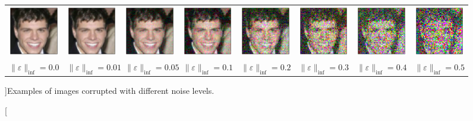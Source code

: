 \begin{figure}[h]
{\begin{tabular}{c|ccccccc}
        \includegraphics[width=0.11\linewidth]{pics/3_adv_att/radius_celeba_ref.pdf} &
        \includegraphics[width=0.11\linewidth]{pics/3_adv_att/radius_celeba_adv_0.pdf} &
        \includegraphics[width=0.11\linewidth]{pics/3_adv_att/radius_celeba_adv_1.pdf} &
        \includegraphics[width=0.11\linewidth]{pics/3_adv_att/radius_celeba_adv_2.pdf} &
        \includegraphics[width=0.11\linewidth]{pics/3_adv_att/radius_celeba_adv_3.pdf} &
        \includegraphics[width=0.11\linewidth]{pics/3_adv_att/radius_celeba_adv_4.pdf} &
        \includegraphics[width=0.11\linewidth]{pics/3_adv_att/radius_celeba_adv_5.pdf} &
        \includegraphics[width=0.11\linewidth]{pics/3_adv_att/radius_celeba_adv_6.pdf} \\
        $\|\varepsilon\|_{\inf} = 0.0$ & $\|\varepsilon\|_{\inf} = 0.01$ & $\|\varepsilon\|_{\inf} = 0.05$  &  $\|\varepsilon\|_{\inf} = 0.1$ &  $\|\varepsilon\|_{\inf} = 0.2$& $\|\varepsilon\|_{\inf} = 0.3$ & $\|\varepsilon\|_{\inf} = 0.4$ &  $\|\varepsilon\|_{\inf} = 0.5$\\
    \end{tabular}}
    \caption[][\baselineskip]{Examples of images corrupted with different noise levels.}
    \label{fig:radius_adversarial_examples}
           \vspace*{\baselineskip}
\end{figure}


